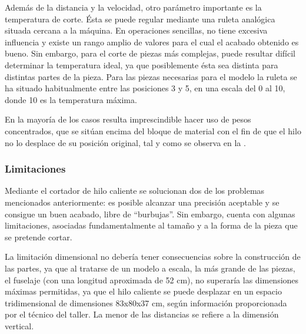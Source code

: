 Además de la distancia y la velocidad, otro parámetro importante es la temperatura de corte. Ésta se puede regular mediante una ruleta analógica situada cercana a la máquina. En operaciones sencillas, no tiene excesiva influencia y existe un rango amplio de valores para el cual el acabado obtenido es bueno. Sin embargo, para el corte de piezas más complejas, puede resultar difícil determinar la temperatura ideal, ya que posiblemente ésta sea distinta para distintas partes de la pieza. Para las piezas necesarias para el modelo la ruleta se ha situado habitualmente entre las posiciones 3 y 5, en una escala del 0 al 10, donde 10 es la temperatura máxima.

En la mayoría de los casos resulta imprescindible hacer uso de pesos concentrados, que se sitúan encima del bloque de material con el fin de que el hilo no lo desplace de su posición original, tal y como se observa en la .


\subsubsection{Limitaciones}
\label{sec:building:technique:limitations}

Mediante el cortador de hilo caliente se solucionan dos de los problemas mencionados anteriormente: es posible alcanzar una precisión aceptable y se consigue un buen acabado, libre de “burbujas”. Sin embargo, cuenta con algunas limitaciones, asociadas fundamentalmente al tamaño y a la forma de la pieza que se pretende cortar.

La limitación dimensional no debería tener consecuencias sobre la construcción de las partes, ya que al tratarse de un modelo a escala, la más grande de las piezas, el fuselaje (con una longitud aproximada de 52 cm), no superaría las dimensiones máximas permitidas, ya que el hilo caliente se puede desplazar en un espacio tridimensional de dimensiones 83x80x37 cm, según información proporcionada por el técnico del taller. La menor de las distancias se refiere a la dimensión vertical.


